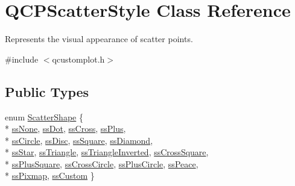 \hypertarget{classQCPScatterStyle}{}\section{Q\+C\+P\+Scatter\+Style Class Reference}
\label{classQCPScatterStyle}


Represents the visual appearance of scatter points.  




{\ttfamily \#include $<$qcustomplot.\+h$>$}

\subsection*{Public Types}
\begin{DoxyCompactItemize}
\item 
enum \hyperlink{classQCPScatterStyle_adb31525af6b680e6f1b7472e43859349}{Scatter\+Shape} \{ \\*
\hyperlink{classQCPScatterStyle_adb31525af6b680e6f1b7472e43859349abd144c291ca274f77053ec68cab6c022}{ss\+None}, 
\hyperlink{classQCPScatterStyle_adb31525af6b680e6f1b7472e43859349a06e15a735b79093a1d999c0374fa3aa1}{ss\+Dot}, 
\hyperlink{classQCPScatterStyle_adb31525af6b680e6f1b7472e43859349a9eacd60f059dc3ef71bf249f515a6fe4}{ss\+Cross}, 
\hyperlink{classQCPScatterStyle_adb31525af6b680e6f1b7472e43859349a2d7f1d3c1a148b9d9d17f2fd9cae5eb7}{ss\+Plus}, 
\\*
\hyperlink{classQCPScatterStyle_adb31525af6b680e6f1b7472e43859349a7c92a110880d0ef2170dff3a5b4f7779}{ss\+Circle}, 
\hyperlink{classQCPScatterStyle_adb31525af6b680e6f1b7472e43859349a281fe1434696dcbab3aa6b9ccfbb09e9}{ss\+Disc}, 
\hyperlink{classQCPScatterStyle_adb31525af6b680e6f1b7472e43859349a279e48703ddc9f1cf4a61d3e2817ab3c}{ss\+Square}, 
\hyperlink{classQCPScatterStyle_adb31525af6b680e6f1b7472e43859349a4fc5929df1b2dad0a3cb2ef2c8b6e633}{ss\+Diamond}, 
\\*
\hyperlink{classQCPScatterStyle_adb31525af6b680e6f1b7472e43859349a6047a2d64e41f1d6ce54445d595d442f}{ss\+Star}, 
\hyperlink{classQCPScatterStyle_adb31525af6b680e6f1b7472e43859349a74a8d4eff1d97b57c53a60d0003453c3}{ss\+Triangle}, 
\hyperlink{classQCPScatterStyle_adb31525af6b680e6f1b7472e43859349a6156274d21d8b4115197567d3ea2d9a8}{ss\+Triangle\+Inverted}, 
\hyperlink{classQCPScatterStyle_adb31525af6b680e6f1b7472e43859349a7081310936c200c6c78e34c172f72d07}{ss\+Cross\+Square}, 
\\*
\hyperlink{classQCPScatterStyle_adb31525af6b680e6f1b7472e43859349a5aa8e9db545e5404482fec774768ee25}{ss\+Plus\+Square}, 
\hyperlink{classQCPScatterStyle_adb31525af6b680e6f1b7472e43859349a524613ba5d1c4eaa1541d74cf339d283}{ss\+Cross\+Circle}, 
\hyperlink{classQCPScatterStyle_adb31525af6b680e6f1b7472e43859349a6fa151d01f1694c9ff9922da686dc535}{ss\+Plus\+Circle}, 
\hyperlink{classQCPScatterStyle_adb31525af6b680e6f1b7472e43859349ada3b2988ece38c121922a4b5007eb08d}{ss\+Peace}, 
\\*
\hyperlink{classQCPScatterStyle_adb31525af6b680e6f1b7472e43859349a8718b849ca7c307b07b8e091efb0c31e}{ss\+Pixmap}, 
\hyperlink{classQCPScatterStyle_adb31525af6b680e6f1b7472e43859349a15d9bcfd9de94edda949006529f9219d}{ss\+Custom}
 \}
\end{DoxyCompactItemize}
